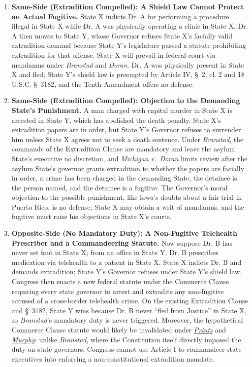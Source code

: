 \documentclass[12pt]{article}
\begin{document}
\begin{enumerate}

\item \textbf{Same-Side (Extradition Compelled): A Shield Law Cannot Protect an Actual Fugitive.} State X indicts Dr. A for performing a procedure illegal in State X while Dr. A was physically operating a clinic in State X. Dr. A then moves to State Y, whose Governor refuses State X's facially valid extradition demand because State Y's legislature passed a statute prohibiting extradition for that offense. State X will prevail in federal court via mandamus under \emph{Branstad} and \emph{Doran}. Dr. A was physically present in State X and fled; State Y's shield law is preempted by Article IV, \S~2, cl. 2 and 18 U.S.C. \S~3182, and the Tenth Amendment offers no defense.

\item \textbf{Same-Side (Extradition Compelled): Objection to the Demanding State's Punishment.} A man charged with capital murder in State X is arrested in State Y, which has abolished the death penalty. State X's extradition papers are in order, but State Y's Governor refuses to surrender him unless State X agrees not to seek a death sentence. Under \emph{Branstad}, the commands of the Extradition Clause are mandatory and leave the asylum State's executive no discretion, and \emph{Michigan v.\ Doran} limits review after the asylum State's governor grants extradition to whether the papers are facially in order, a crime has been charged in the demanding State, the detainee is the person named, and the detainee is a fugitive. The Governor's moral objection to the possible punishment, like Iowa's doubts about a fair trial in Puerto Rico, is no defense; State X may obtain a writ of mandamus, and the fugitive must raise his objections in State X's courts.

\item \textbf{Opposite-Side (No Mandatory Duty): A Non-Fugitive Telehealth Prescriber and a Commandeering Statute.} Now suppose Dr. B has never set foot in State X; from an office in State Y, Dr. B prescribes medication via telehealth to a patient in State X. State X indicts Dr. B and demands extradition; State Y's Governor refuses under State Y's shield law. Congress then enacts a new federal statute under the Commerce Clause requiring every state governor to arrest and extradite any non-fugitive accused of a cross-border telehealth crime. On the existing Extradition Clause and \S~3182, State Y wins because Dr. B never ``fled from Justice'' in State X, so \emph{Branstad}'s mandatory duty is never triggered. Moreover, the hypothetical Commerce Clause statute would likely be invalidated under \href{https://supreme.justia.com/cases/federal/us/521/898/}{\emph{Printz}} and \href{https://supreme.justia.com/cases/federal/us/584/16-476/}{\emph{Murphy}}: unlike \emph{Branstad}, where the Constitution itself directly imposed the duty on state governors, Congress cannot use Article I to commandeer state executives into enforcing a non-constitutional extradition mandate.


\end{enumerate}
\end{document}
